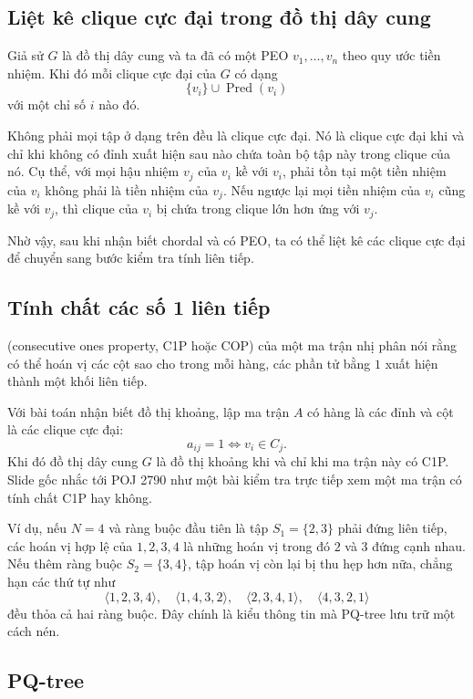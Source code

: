 \documentclass[11pt]{article}
\begin{document}
\subsection{Liệt kê clique cực đại trong đồ thị dây cung}

Giả sử $G$ là đồ thị dây cung và ta đã có một PEO
$v_1,\ldots,v_n$ theo quy ước tiền nhiệm. Khi đó mỗi clique cực đại của $G$ có
dạng
\[
  \{v_i\}\cup \operatorname{Pred}(v_i)
\]
với một chỉ số $i$ nào đó.

Không phải mọi tập ở dạng trên đều là clique cực đại. Nó là clique cực đại khi
và chỉ khi không có đỉnh xuất hiện sau nào chứa toàn bộ tập này trong clique
của nó. Cụ thể, với mọi hậu nhiệm $v_j$ của $v_i$ kề với $v_i$, phải tồn tại
một tiền nhiệm của $v_i$ không phải là tiền nhiệm của $v_j$. Nếu ngược lại mọi
tiền nhiệm của $v_i$ cũng kề với $v_j$, thì clique của $v_i$ bị chứa trong
clique lớn hơn ứng với $v_j$.

Nhờ vậy, sau khi nhận biết chordal và có PEO, ta có thể liệt kê các clique cực
đại để chuyển sang bước kiểm tra tính liên tiếp.

\subsection{Tính chất các số 1 liên tiếp}

 (consecutive ones property, C1P hoặc COP)
của một ma trận nhị phân nói rằng có thể hoán vị các cột sao cho trong mỗi
hàng, các phần tử bằng $1$ xuất hiện thành một khối liên tiếp.

Với bài toán nhận biết đồ thị khoảng, lập ma trận $A$ có hàng là các đỉnh và
cột là các clique cực đại:
\[
  a_{ij}=1 \Longleftrightarrow v_i\in C_j.
\]
Khi đó đồ thị dây cung $G$ là đồ thị khoảng khi và chỉ khi ma trận này có C1P.
Slide gốc nhắc tới POJ 2790 như một bài kiểm tra trực tiếp xem một ma trận có
tính chất C1P hay không.

Ví dụ, nếu $N=4$ và ràng buộc đầu tiên là tập $S_1=\{2,3\}$ phải đứng liên
tiếp, các hoán vị hợp lệ của $1,2,3,4$ là những hoán vị trong đó $2$ và $3$
đứng cạnh nhau. Nếu thêm ràng buộc $S_2=\{3,4\}$, tập hoán vị còn lại bị thu
hẹp hơn nữa, chẳng hạn các thứ tự như
\[
  \langle 1,2,3,4\rangle,\quad
  \langle 1,4,3,2\rangle,\quad
  \langle 2,3,4,1\rangle,\quad
  \langle 4,3,2,1\rangle
\]
đều thỏa cả hai ràng buộc. Đây chính là kiểu thông tin mà PQ-tree lưu trữ một
cách nén.

\subsection{PQ-tree}
\end{document}
